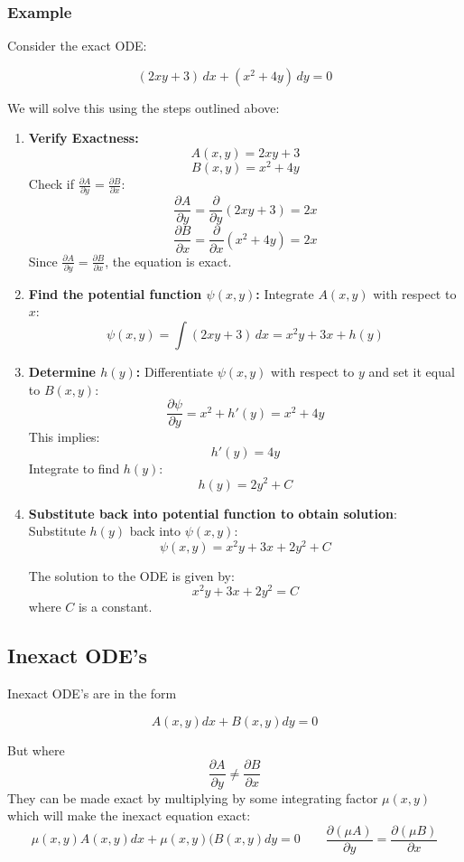 \documentclass[12pt]{article}
\begin{document}
\subsubsection{Example}
Consider the exact ODE:

\[ (2xy + 3) \, dx + (x^2 + 4y) \, dy = 0 \]

We will solve this using the steps outlined above:

\begin{enumerate}
\item \textbf{Verify Exactness:}
    \[ A(x, y) = 2xy + 3 \]
    \[ B(x, y) = x^2 + 4y \]
    Check if \(\frac{\partial A}{\partial y} = \frac{\partial B}{\partial x}\):
    \[ \frac{\partial A}{\partial y} = \frac{\partial}{\partial y} (2xy + 3) = 2x \]
    \[ \frac{\partial B}{\partial x} = \frac{\partial}{\partial x} (x^2 + 4y) = 2x \]
    Since \(\frac{\partial A}{\partial y} = \frac{\partial B}{\partial x}\), the equation is exact.

\item \textbf{Find the potential function \(\psi(x, y)\):}
    Integrate \(A(x, y)\) with respect to \(x\):
    \[ \psi(x, y) = \int (2xy + 3) \, dx = x^2y + 3x + h(y) \]

\item \textbf{Determine \(h(y)\):}
    Differentiate \(\psi(x, y)\) with respect to \(y\) and set it equal to \(B(x, y)\):
    \[ \frac{\partial \psi}{\partial y} = x^2 + h'(y) = x^2 + 4y \]
    This implies:
    \[ h'(y) = 4y \]
    Integrate to find \(h(y)\):
    \[ h(y) = 2y^2 + C \]

\item \textbf{Substitute back into potential function to obtain solution}:\\
    Substitute \(h(y)\) back into \(\psi(x, y)\):
    \[ \psi(x, y) = x^2y + 3x + 2y^2 + C \]

    The solution to the ODE is given by:
    \[ x^2y + 3x + 2y^2 = C \]
    where \(C\) is a constant.
\end{enumerate}

\subsection{Inexact ODE's}
Inexact ODE's are in the form

\[A(x,y) dx + B(x,y)dy = 0\]

But where
\[\frac{\partial A}{\partial y} \neq \frac{\partial B}{\partial x}\]
They can be made exact by multiplying by some integrating factor \(\mu(x,y)\) which will make the inexact equation exact:
\[\mu(x,y)A(x,y)dx + \mu(x,y)(B(x,y)dy = 0 \qquad \frac{\partial (\mu A)}{\partial y} = \frac{\partial( \mu B)}{\partial x}\]
\end{document}
